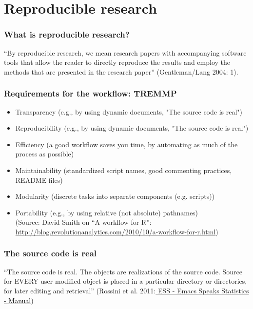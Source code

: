 \documentclass[bigger]{beamer}
\begin{document}
\section{Reproducible research}
\label{sec-2}
\begin{frame}
\frametitle{What is reproducible research?}
\label{sec-2_1}


``By reproducible research, we mean research papers with accompanying software tools that allow the
reader to directly reproduce the results and employ the methods that are presented in the research
paper'' (Gentleman/Lang 2004: 1). 
\end{frame}
\begin{frame}
\frametitle{Requirements for the workflow: TREMMP}
\label{sec-2_2}

\small
\begin{itemize}

\item Transparency (e.g., by using dynamic documents, "The source code is real")\\
\label{sec-2_2_1}%
\item Reproducibility (e.g., by using dynamic documents, "The source code is real")\\
\label{sec-2_2_2}%
\item Efficiency (a good workflow saves you time, by automating as much of the process as possible)\\
\label{sec-2_2_3}%
\item Maintainability (standardized script names, good commenting practices, README files)\\
\label{sec-2_2_4}%
\item Modularity (discrete tasks into separate components (e.g. scripts))\\
\label{sec-2_2_5}%
\item Portability (e.g., by using relative (not absolute) pathnames)\\
\label{sec-2_2_6}%
\vfill
\tiny
(Source: David Smith on ``A workflow for R'': \href{http://blog.revolutionanalytics.com/2010/10/a-workflow-for-r.html}{http://blog.revolutionanalytics.com/2010/10/a-workflow-for-r.html})




\end{itemize} %
\end{frame}
\begin{frame}
\frametitle{The source code is real}
\label{sec-2_3}


``The source code is real. The objects are realizations of the source code. Source for EVERY user
modified object is placed in a particular directory or directories, for later editing and retrieval''
(Rossini et al. 2011:\href{http://ess.r-project.org/Manual/ess.html}{ ESS - Emacs Speaks Statistics - Manual})
\end{frame}
\end{document}
